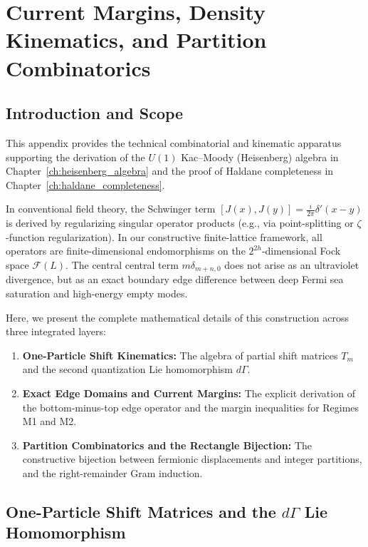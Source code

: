\chapter[Current Margins, Kinematics, and Partitions]{Current Margins, Density Kinematics, and Partition Combinatorics}
\label{app:density_partitions}

\section{Introduction and Scope}

This appendix provides the technical combinatorial and kinematic apparatus supporting the derivation of the $U(1)$ Kac--Moody (Heisenberg) algebra in Chapter~\ref{ch:heisenberg_algebra} and the proof of Haldane completeness in Chapter~\ref{ch:haldane_completeness}.

In conventional field theory, the Schwinger term $[J(x), J(y)] = \frac{i}{2\pi} \delta'(x - y)$ is derived by regularizing singular operator products (e.g., via point-splitting or $\zeta$-function regularization). In our constructive finite-lattice framework, all operators are finite-dimensional endomorphisms on the $2^{2h}$-dimensional Fock space $\mathcal{F}(L)$. The central central term $m \delta_{m+n, 0}$ does not arise as an ultraviolet divergence, but as an exact boundary edge difference between deep Fermi sea saturation and high-energy empty modes.

Here, we present the complete mathematical details of this construction across three integrated layers:
\begin{enumerate}
    \item \textbf{One-Particle Shift Kinematics:} The algebra of partial shift matrices $T_m$ and the second quantization Lie homomorphism $d\Gamma$.
    \item \textbf{Exact Edge Domains and Current Margins:} The explicit derivation of the bottom-minus-top edge operator and the margin inequalities for Regimes M1 and M2.
    \item \textbf{Partition Combinatorics and the Rectangle Bijection:} The constructive bijection between fermionic displacements and integer partitions, and the right-remainder Gram induction.
\end{enumerate}

\section[One-Particle Shift Matrices and the dGamma Lie Homomorphism]{One-Particle Shift Matrices and the $d\Gamma$ Lie Homomorphism}


